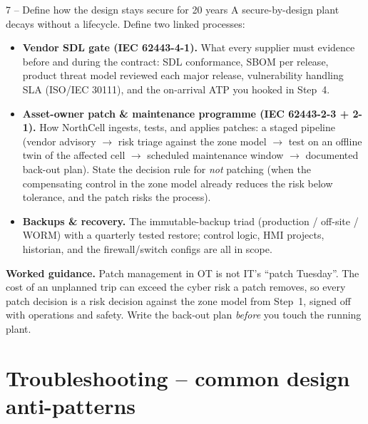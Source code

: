 \documentclass[11pt,a4paper]{article}
\begin{document}
\begin{stepbox}{7 -- Define how the design stays secure for 20 years}
A secure-by-design plant decays without a lifecycle. Define two
linked processes:
\begin{itemize}\setlength{\itemsep}{1pt}
  \item \textbf{Vendor SDL gate (IEC 62443-4-1).} What every supplier
    must evidence before and during the contract: SDL conformance,
    SBOM per release, product threat model reviewed each major release,
    vulnerability handling SLA (ISO/IEC 30111), and the on-arrival ATP
    you hooked in Step~4.
  \item \textbf{Asset-owner patch \& maintenance programme (IEC 62443-2-3
    + 2-1).} How NorthCell ingests, tests, and applies patches: a staged
    pipeline (vendor advisory $\to$ risk triage against the zone model
    $\to$ test on an offline twin of the affected cell $\to$ scheduled
    maintenance window $\to$ documented back-out plan). State the
    decision rule for \emph{not} patching (when the compensating control
    in the zone model already reduces the risk below tolerance, and the
    patch risks the process).
  \item \textbf{Backups \& recovery.} The immutable-backup triad
    (production / off-site / WORM) with a quarterly tested restore;
    control logic, HMI projects, historian, and the firewall/switch
    configs are all in scope.
\end{itemize}

\medskip
\noindent\textbf{Worked guidance.} Patch management in OT is not IT's
``patch Tuesday''. The cost of an unplanned trip can exceed the cyber
risk a patch removes, so every patch decision is a risk decision against
the zone model from Step~1, signed off with operations and safety. Write
the back-out plan \emph{before} you touch the running plant.
\end{stepbox}

\section*{Troubleshooting -- common design anti-patterns}
\end{document}
